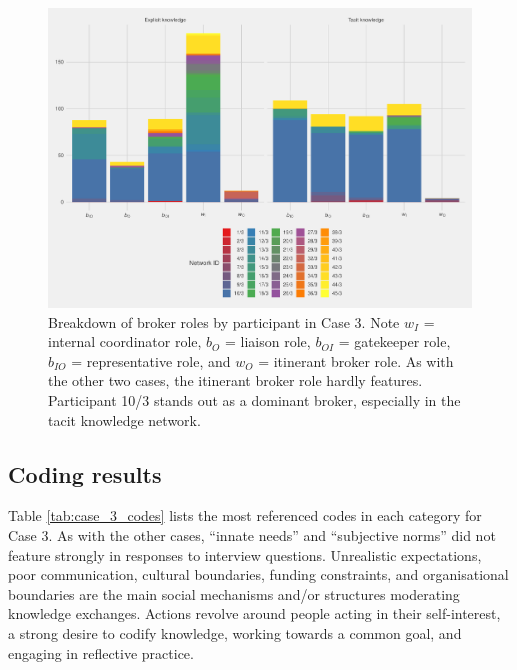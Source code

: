 \begin{figure}
\centering
\includegraphics[width = \textwidth]{Images/gf_case3.pdf}
\caption[Breakdown of broker roles by participant in Case 3]{Breakdown of broker roles by participant in Case 3. Note $w_I$ = internal coordinator role, $b_O$ = liaison role, $b_{OI}$ = gatekeeper role, $b_{IO}$ = representative role, and $w_O$ = itinerant broker role. As with the other two cases, the itinerant broker role hardly features. Participant 10/3 stands out as a dominant broker, especially in the tacit knowledge network.}
\label{fig:gf_c3}
\end{figure}

\subsection{Coding results}

Table \ref{tab:case_3_codes} lists the most referenced codes in each category for Case 3. As with the other cases, \enquote{innate needs} and \enquote{subjective norms} did not feature strongly in responses to interview questions. Unrealistic expectations, poor communication, cultural boundaries, funding constraints, and organisational boundaries are the main social mechanisms and/or structures moderating knowledge exchanges. Actions revolve around people acting in their self-interest, a strong desire to codify knowledge, working towards a common goal, and engaging in reflective practice. \medskip


